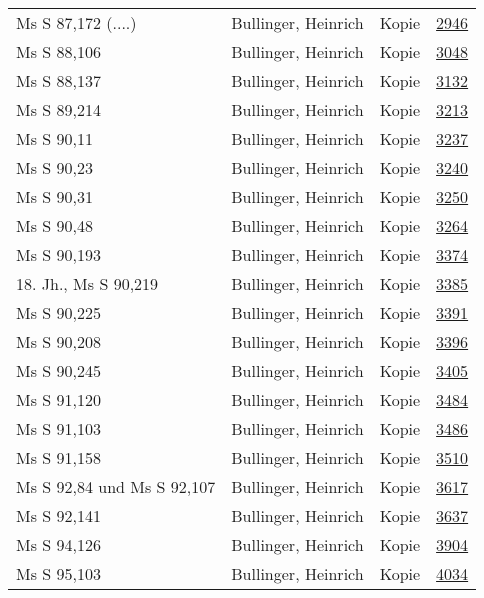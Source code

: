 \documentclass[10pt,a4paper,landscape]{report}
\begin{document}
\begin{longtable}{p{16cm}p{4cm}lr}
Ms S 87,172 (....)	&	Bullinger, Heinrich	&	Kopie	&	\href{http://130.60.24.72/assignment/2946}{2946}\\
Ms S 88,106	&	Bullinger, Heinrich	&	Kopie	&	\href{http://130.60.24.72/assignment/3048}{3048}\\
Ms S 88,137	&	Bullinger, Heinrich	&	Kopie	&	\href{http://130.60.24.72/assignment/3132}{3132}\\
Ms S 89,214	&	Bullinger, Heinrich	&	Kopie	&	\href{http://130.60.24.72/assignment/3213}{3213}\\
Ms S 90,11	&	Bullinger, Heinrich	&	Kopie	&	\href{http://130.60.24.72/assignment/3237}{3237}\\
Ms S 90,23	&	Bullinger, Heinrich	&	Kopie	&	\href{http://130.60.24.72/assignment/3240}{3240}\\
Ms S 90,31	&	Bullinger, Heinrich	&	Kopie	&	\href{http://130.60.24.72/assignment/3250}{3250}\\
Ms S 90,48	&	Bullinger, Heinrich	&	Kopie	&	\href{http://130.60.24.72/assignment/3264}{3264}\\
Ms S 90,193	&	Bullinger, Heinrich	&	Kopie	&	\href{http://130.60.24.72/assignment/3374}{3374}\\
18. Jh., Ms S 90,219	&	Bullinger, Heinrich	&	Kopie	&	\href{http://130.60.24.72/assignment/3385}{3385}\\
Ms S 90,225	&	Bullinger, Heinrich	&	Kopie	&	\href{http://130.60.24.72/assignment/3391}{3391}\\
Ms S 90,208	&	Bullinger, Heinrich	&	Kopie	&	\href{http://130.60.24.72/assignment/3396}{3396}\\
Ms S 90,245	&	Bullinger, Heinrich	&	Kopie	&	\href{http://130.60.24.72/assignment/3405}{3405}\\
Ms S 91,120	&	Bullinger, Heinrich	&	Kopie	&	\href{http://130.60.24.72/assignment/3484}{3484}\\
Ms S 91,103	&	Bullinger, Heinrich	&	Kopie	&	\href{http://130.60.24.72/assignment/3486}{3486}\\
Ms S 91,158	&	Bullinger, Heinrich	&	Kopie	&	\href{http://130.60.24.72/assignment/3510}{3510}\\
Ms S 92,84 und Ms S 92,107	&	Bullinger, Heinrich	&	Kopie	&	\href{http://130.60.24.72/assignment/3617}{3617}\\
Ms S 92,141	&	Bullinger, Heinrich	&	Kopie	&	\href{http://130.60.24.72/assignment/3637}{3637}\\
Ms S 94,126	&	Bullinger, Heinrich	&	Kopie	&	\href{http://130.60.24.72/assignment/3904}{3904}\\
Ms S 95,103	&	Bullinger, Heinrich	&	Kopie	&	\href{http://130.60.24.72/assignment/4034}{4034}\\

\end{longtable}
\end{document}
